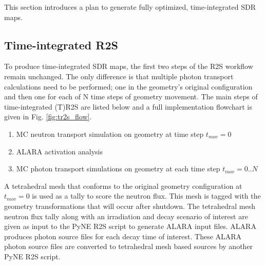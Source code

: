 This section introduces a plan to generate fully optimized, time-integrated
SDR maps.


\subsection{Time-integrated R2S}\label{sec:tr2s}
To produce time-integrated SDR maps, the
first two steps of the R2S workflow remain unchanged.
The only difference is that multiple photon transport calculations need
to be performed; one in the geometry's original configuration and then
one for each of N time steps of geometry movement.
The main steps of time-integrated (T)R2S
are listed below and a full implementation flowchart is given in Fig. \ref{fig:tr2s_flow}.
\begin{enumerate}
	\item{MC neutron transport simulation on geometry at time step $t_{mov}=0$}
	\item{ALARA activation analysis} 
	\item{MC photon transport simulations on geometry at each time step $t_{mov}=0..N$}
\end{enumerate}
A tetrahedral mesh that conforms to
the original geometry configuration at $t_{mov}=0$ is used as a tally to score the neutron flux.
This mesh is tagged with the geometry transformations that will occur after
shutdown.  The tetrahedral mesh neutron flux tally along with an irradiation and decay
scenario of interest are given as input to the PyNE R2S
script to generate ALARA input files.  ALARA produces photon source
files for each decay time of interest.  These ALARA photon source files are
converted to tetrahedral mesh based sources by another PyNE R2S script.  

